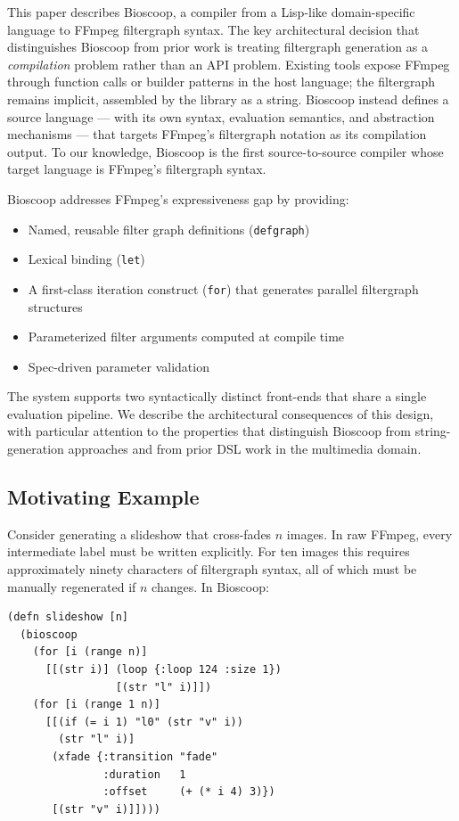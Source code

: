 \documentclass[conference]{IEEEtran}
\begin{document}
This paper describes Bioscoop, a compiler from a Lisp-like domain-specific language to FFmpeg filtergraph syntax. The key architectural decision that distinguishes Bioscoop from prior work is treating filtergraph generation as a \emph{compilation} problem rather than an API problem. Existing tools expose FFmpeg through function calls or builder patterns in the host language; the filtergraph remains implicit, assembled by the library as a string. Bioscoop instead defines a source language --- with its own syntax, evaluation semantics, and abstraction mechanisms --- that targets FFmpeg's filtergraph notation as its compilation output. To our knowledge, Bioscoop is the first source-to-source compiler whose target language is FFmpeg's filtergraph syntax.

Bioscoop addresses FFmpeg's expressiveness gap by providing:

\begin{itemize}
\item Named, reusable filter graph definitions (\texttt{defgraph})
\item Lexical binding (\texttt{let})
\item A first-class iteration construct (\texttt{for}) that generates parallel filtergraph structures
\item Parameterized filter arguments computed at compile time
\item Spec-driven parameter validation
\end{itemize}

The system supports two syntactically distinct front-ends that share a single evaluation pipeline. We describe the architectural consequences of this design, with particular attention to the properties that distinguish Bioscoop from string-generation approaches and from prior DSL work in the multimedia domain.

\subsection{Motivating Example}

Consider generating a slideshow that cross-fades $n$ images. In raw FFmpeg, every intermediate label must be written explicitly. For ten images this requires approximately ninety characters of filtergraph syntax, all of which must be manually regenerated if $n$ changes. In Bioscoop:

\begin{lstlisting}[caption={Parameterized slideshow in Bioscoop}]
(defn slideshow [n]
  (bioscoop
    (for [i (range n)]
      [[(str i)] (loop {:loop 124 :size 1})
                 [(str "l" i)]])
    (for [i (range 1 n)]
      [[(if (= i 1) "l0" (str "v" i))
        (str "l" i)]
       (xfade {:transition "fade"
               :duration   1
               :offset     (+ (* i 4) 3)})
       [(str "v" i)]])))
\end{lstlisting}
\end{document}
